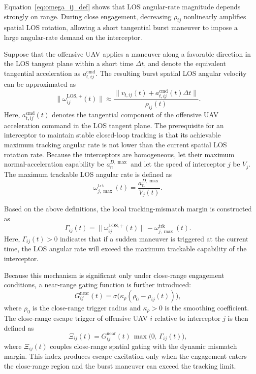 \documentclass[unbranded]{cja}
\begin{document}
Equation~\eqref{eq:omega_ij_def} shows that LOS angular-rate magnitude depends strongly on range. During close engagement, decreasing $\rho_{ij}$ nonlinearly amplifies spatial LOS rotation, allowing a short tangential burst maneuver to impose a large angular-rate demand on the interceptor.

Suppose that the offensive UAV applies a maneuver along a favorable direction in the LOS tangent plane within a short time $\Delta t$, and denote the equivalent tangential acceleration as $a_{t,ij}^{\mathrm{cmd}}$. The resulting burst spatial LOS angular velocity can be approximated as
\begin{equation}
\|\omega_{ij}^{\mathrm{LOS},+}(t)\|
\approx
\frac{\|v_{t,ij}(t)+a_{t,ij}^{\mathrm{cmd}}(t)\Delta t\|}{\rho_{ij}(t)}.
\end{equation}
Here, $a_{t,ij}^{\mathrm{cmd}}(t)$ denotes the tangential component of the offensive UAV acceleration command in the LOS tangent plane.
The prerequisite for an interceptor to maintain stable closed-loop tracking is that its achievable maximum tracking angular rate is not lower than the current spatial LOS rotation rate. Because the interceptors are homogeneous, let their maximum normal-acceleration capability be $a_n^{D,\max}$ and let the speed of interceptor $j$ be $V_j$. The maximum trackable LOS angular rate is defined as
\begin{equation}
\omega_{j,\max}^{\mathrm{trk}}(t)
=
\frac{a_n^{D,\max}}{V_j(t)}.
\end{equation}

Based on the above definitions, the local tracking-mismatch margin is constructed as
\begin{equation}
\Gamma_{ij}(t)
=
\|\omega_{ij}^{\mathrm{LOS},+}(t)\|
-
\omega_{j,\max}^{\mathrm{trk}}(t).
\end{equation}
Here, $\Gamma_{ij}(t)>0$ indicates that if a sudden maneuver is triggered at the current time, the LOS angular rate will exceed the maximum trackable capability of the interceptor.

Because this mechanism is significant only under close-range engagement conditions, a near-range gating function is further introduced:
\begin{equation}
G_{ij}^{\mathrm{near}}(t)
=
\sigma\!\bigl(\kappa_{\rho}(\rho_0-\rho_{ij}(t))\bigr),
\end{equation}
where $\rho_0$ is the close-range trigger radius and $\kappa_{\rho}>0$ is the smoothing coefficient. The close-range escape trigger of offensive UAV $i$ relative to interceptor $j$ is then defined as
\begin{equation}
\Xi_{ij}(t)
=
G_{ij}^{\mathrm{near}}(t)\,\max\bigl(0,\, \Gamma_{ij}(t)\bigr),
\end{equation}
where $\Xi_{ij}(t)$ couples close-range spatial gating with the dynamic mismatch margin. This index produces escape excitation only when the engagement enters the close-range region and the burst maneuver can exceed the tracking limit.
\end{document}
